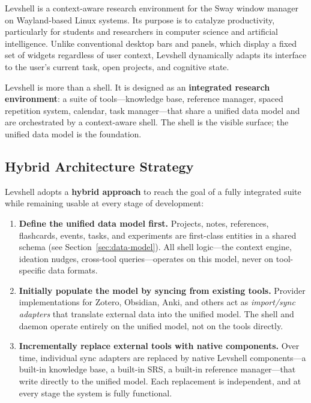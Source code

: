 \documentclass[11pt,a4paper]{article}
\begin{document}
Levshell is a context-aware research environment for the Sway window manager on Wayland-based Linux systems. Its purpose is to catalyze productivity, particularly for students and researchers in computer science and artificial intelligence. Unlike conventional desktop bars and panels, which display a fixed set of widgets regardless of user context, Levshell dynamically adapts its interface to the user's current task, open projects, and cognitive state.

Levshell is more than a shell. It is designed as an \textbf{integrated research environment}: a suite of tools---knowledge base, reference manager, spaced repetition system, calendar, task manager---that share a unified data model and are orchestrated by a context-aware shell. The shell is the visible surface; the unified data model is the foundation.

\subsection{Hybrid Architecture Strategy}

Levshell adopts a \textbf{hybrid approach} to reach the goal of a fully integrated suite while remaining usable at every stage of development:

\begin{enumerate}[leftmargin=1.5em, itemsep=4pt]
  \item \textbf{Define the unified data model first.} Projects, notes, references, flashcards, events, tasks, and experiments are first-class entities in a shared schema (see Section~\ref{sec:data-model}). All shell logic---the context engine, ideation nudges, cross-tool queries---operates on this model, never on tool-specific data formats.

  \item \textbf{Initially populate the model by syncing from existing tools.} Provider implementations for Zotero, Obsidian, Anki, and others act as \emph{import/sync adapters} that translate external data into the unified model. The shell and daemon operate entirely on the unified model, not on the tools directly.

  \item \textbf{Incrementally replace external tools with native components.} Over time, individual sync adapters are replaced by native Levshell components---a built-in knowledge base, a built-in SRS, a built-in reference manager---that write directly to the unified model. Each replacement is independent, and at every stage the system is fully functional.
\end{enumerate}
\end{document}

